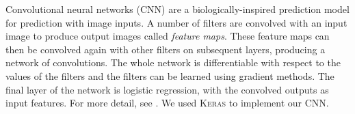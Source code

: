 \documentclass[fleqn,usenatbib,usedcolumn]{mnras}
\begin{document}
      Convolutional neural networks (CNN) are a biologically-inspired prediction
      model for prediction with image inputs. A number of filters are convolved
      with an input image to produce output images called \emph{feature maps}.
      These feature maps can then be convolved again with other filters on
      subsequent layers, producing a network of convolutions. The whole network
      is differentiable with respect to the values of the filters and the
      filters can be learned using gradient methods. The final layer of the
      network is logistic regression, with the convolved outputs as input
      features. For more detail, see \citet[subsection II.A][]{lecun98}. We used
      \textsc{Keras} \citep{chollet15keras} to implement our CNN.

\end{document}
